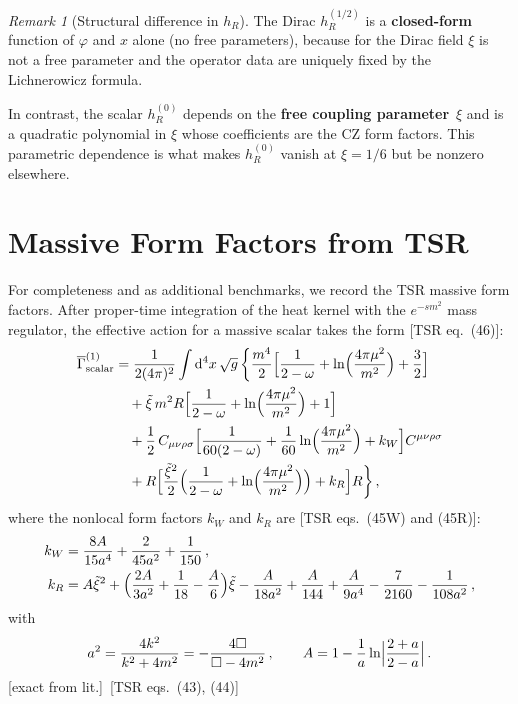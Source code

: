 \documentclass[12pt,a4paper]{article}
\theoremstyle{definition}
\theoremstyle{remark}
\newtheorem{remark}[proposition]{Remark}
\newcommand{\dd}{\mathrm{d}}
\newcommand{\fromlit}[1]{\textcolor{blue!70!black}{\textsf{[#1]}}}
\newcommand{\exactlit}{\textcolor{blue!60!black}{\textsf{[exact from lit.]}}}
\begin{document}
\begin{remark}[Structural difference in $h_R$]
\label{rem:hR-structure}
The Dirac $h_R^{(1/2)}$ is a \textbf{closed-form} function of
$\varphi$ and $x$ alone (no free parameters), because for the
Dirac field $\xi$ is not a free parameter and the operator data
are uniquely fixed by the Lichnerowicz formula.

In contrast, the scalar $h_R^{(0)}$ depends on the \textbf{free
coupling parameter}~$\xi$ and is a quadratic polynomial in $\xi$
whose coefficients are the CZ form factors.  This parametric
dependence is what makes $h_R^{(0)}$ vanish at $\xi=1/6$ but be
nonzero elsewhere.
\end{remark}


\section{Massive Form Factors from TSR}
\label{sec:massive}

For completeness and as additional benchmarks, we record the TSR
massive form factors.  After proper-time integration of the heat
kernel with the $e^{-sm^2}$ mass regulator, the effective action
for a massive scalar takes the form \fromlit{TSR eq.~(46)}:
\begin{align}
  \overline{\Gamma}^{(1)}_{\mathrm{scalar}}
  &= \frac{1}{2(4\pi)^2}\int \dd^4x\,\sqrt{g}\,\biggl\{
    \frac{m^4}{2}\Bigl[\frac{1}{2-\omega}
      + \ln\Bigl(\frac{4\pi\mu^2}{m^2}\Bigr)
      + \frac{3}{2}\Bigr]
  \nonumber\\
  &\quad + \tilde{\xi}\,m^2 R\Bigl[\frac{1}{2-\omega}
      + \ln\Bigl(\frac{4\pi\mu^2}{m^2}\Bigr) + 1\Bigr]
  \nonumber\\
  &\quad + \frac{1}{2}\,C_{\mu\nu\rho\sigma}\Bigl[
    \frac{1}{60(2-\omega)}
    + \frac{1}{60}\ln\Bigl(\frac{4\pi\mu^2}{m^2}\Bigr)
    + k_W\Bigr]C^{\mu\nu\rho\sigma}
  \nonumber\\
  &\quad + R\Bigl[\frac{\tilde{\xi}^2}{2}\Bigl(\frac{1}{2-\omega}
    + \ln\Bigl(\frac{4\pi\mu^2}{m^2}\Bigr)\Bigr)
    + k_R\Bigr]R\biggr\}\,,
  \label{eq:TSR-full-action}
\end{align}
where the nonlocal form factors $k_W$ and $k_R$ are
\fromlit{TSR eqs.~(45W) and (45R)}:
\begin{align}
  k_W &= \frac{8A}{15a^4} + \frac{2}{45a^2} + \frac{1}{150}\,,
  \label{eq:kW}\\
  k_R &= A\tilde{\xi}^2
    + \Bigl(\frac{2A}{3a^2} + \frac{1}{18} - \frac{A}{6}\Bigr)\tilde{\xi}
    - \frac{A}{18a^2} + \frac{A}{144} + \frac{A}{9a^4}
    - \frac{7}{2160} - \frac{1}{108a^2}\,,
  \label{eq:kR}
\end{align}
with
\begin{equation}
  a^2 = \frac{4k^2}{k^2 + 4m^2} = -\frac{4\Box}{\Box - 4m^2}\,,
  \qquad
  A = 1 - \frac{1}{a}\ln\Bigl|\frac{2+a}{2-a}\Bigr|\,.
  \label{eq:a-A-def}
\end{equation}
\exactlit\ \fromlit{TSR eqs.~(43), (44)}
\end{document}
